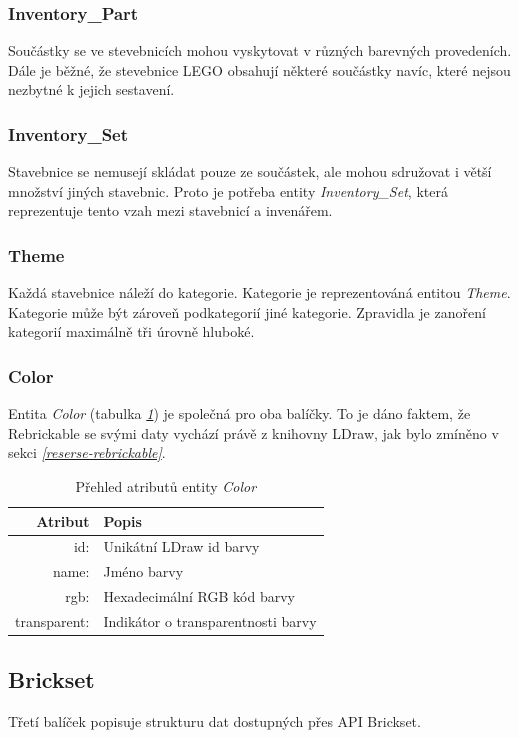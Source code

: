 \subsubsection*{Inventory\_Part} 
Součástky se ve stevebnicích mohou vyskytovat v různých barevných provedeních. Dále je běžné, že stevebnice LEGO obsahují některé součástky navíc, které nejsou nezbytné k jejich sestavení.

\subsubsection*{Inventory\_Set}
Stavebnice se nemusejí skládat pouze ze součástek, ale mohou sdružovat i větší množství jiných stavebnic. Proto je potřeba entity \textit{Inventory\_Set}, která reprezentuje tento vzah mezi stavebnicí a invenářem.

\subsubsection*{Theme}
Každá stavebnice náleží do kategorie. Kategorie je reprezentováná entitou \textit{Theme}. Kategorie může být zároveň podkategorií jiné kategorie. Zpravidla je zanoření kategorií maximálně tři úrovně hluboké.

\subsubsection*{Color} 
Entita \textit{Color} (tabulka \emph{\ref{table:entity:color}}) je společná pro oba balíčky. To je dáno faktem, že Rebrickable se svými daty vychází právě z knihovny LDraw, jak bylo zmíněno v sekci \emph{\ref{reserse-rebrickable}}.

\begin{table}[th!]
  \centering
  \caption{Přehled atributů entity \textit{Color}}
  \label{table:entity:color}
  \begin{tabularx}{\textwidth}{@{}rX@{}}
  \toprule
  Atribut & Popis
  \\ \midrule
  id: & Unikátní LDraw id barvy \autocite{ldraw:colors}
  \\
  name: & Jméno barvy
  \\
  rgb: & Hexadecimální \gls{RGB} kód barvy 
  \\
  transparent: & Indikátor o transparentnosti barvy
  \\
  \bottomrule
  \end{tabularx}
\end{table}

\subsection{Brickset}
Třetí balíček popisuje strukturu dat dostupných přes \gls{API} Brickset.   

